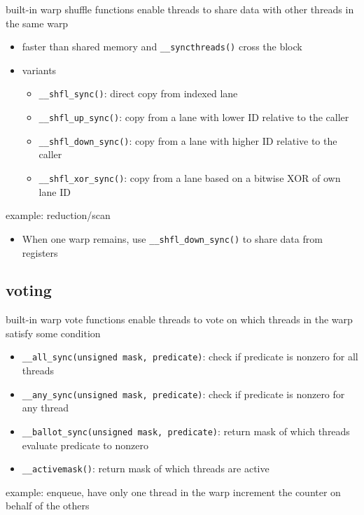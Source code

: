 \documentclass{article}
\begin{document}
built-in warp shuffle functions enable threads to share data with other threads in the same warp

\begin{itemize}
\item faster than shared memory and \texttt{\_\_syncthreads()} cross the block
\end{itemize}
\begin{itemize}
\item variants
\begin{itemize}
\item \texttt{\_\_shfl\_sync()}: direct copy from indexed lane
\item \texttt{\_\_shfl\_up\_sync()}: copy from a lane with lower ID relative to the caller
\item \texttt{\_\_shfl\_down\_sync()}: copy from a lane with higher ID relative to the caller
\item \texttt{\_\_shfl\_xor\_sync()}: copy from a lane based on a bitwise XOR of own lane ID

\end{itemize}
\end{itemize}
example: reduction/scan

\begin{itemize}
\item When one warp remains, use \texttt{\_\_shfl\_down\_sync()} to share data from registers

\end{itemize}
\subsection{voting}

built-in warp vote functions enable threads to vote on which threads in the warp satisfy some condition

\begin{itemize}
\item \texttt{\_\_all\_sync(unsigned mask, predicate)}: check if predicate is nonzero for all threads
\item \texttt{\_\_any\_sync(unsigned mask, predicate)}: check if predicate is nonzero for any thread
\item \texttt{\_\_ballot\_sync(unsigned mask, predicate)}: return mask of which threads evaluate predicate to nonzero
\item \texttt{\_\_activemask()}: return mask of which threads are active

\end{itemize}
example: enqueue, have only one thread in the warp increment the counter on behalf of the others
\end{document}
